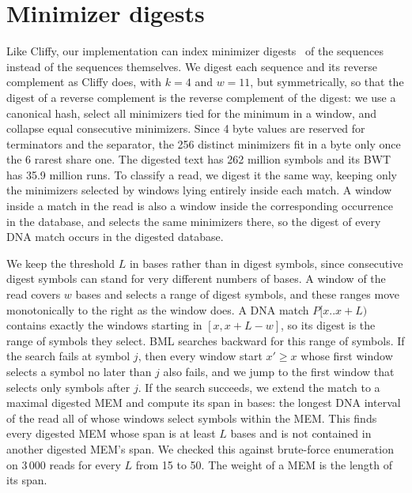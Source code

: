 \section{Minimizer digests}
\label{sec:digest}

Like Cliffy, our implementation can index minimizer digests~\cite{RHH+04,AhmedEtAl2023} of the sequences instead of the sequences themselves.
We digest each sequence and its reverse complement as Cliffy does, with $k = 4$ and $w = 11$, but symmetrically, so that the digest of a reverse complement is the reverse complement of the digest: we use a canonical hash, select all minimizers tied for the minimum in a window, and collapse equal consecutive minimizers.
Since 4 byte values are reserved for terminators and the separator, the 256 distinct minimizers fit in a byte only once the 6 rarest share one.
The digested text has 262 million symbols and its BWT has 35.9 million runs.
To classify a read, we digest it the same way, keeping only the minimizers selected by windows lying entirely inside each match.
A window inside a match in the read is also a window inside the corresponding occurrence in the database, and selects the same minimizers there, so the digest of every DNA match occurs in the digested database.

We keep the threshold $L$ in bases rather than in digest symbols, since consecutive digest symbols can stand for very different numbers of bases.
A window of the read covers $w$ bases and selects a range of digest symbols, and these ranges move monotonically to the right as the window does.
A DNA match $P[x..x + L)$ contains exactly the windows starting in $[x, x + L - w]$, so its digest is the range of symbols they select.
BML searches backward for this range of symbols.
If the search fails at symbol $j$, then every window start $x' \geq x$ whose first window selects a symbol no later than $j$ also fails, and we jump to the first window that selects only symbols after $j$.
If the search succeeds, we extend the match to a maximal digested MEM and compute its span in bases: the longest DNA interval of the read all of whose windows select symbols within the MEM.
This finds every digested MEM whose span is at least $L$ bases and is not contained in another digested MEM's span.
We checked this against brute-force enumeration on 3\,000 reads for every $L$ from 15 to 50.
The weight of a MEM is the length of its span.

